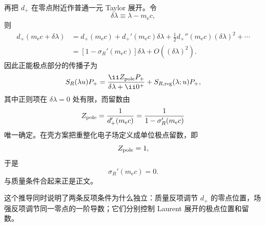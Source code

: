 \begin{derivation}[电子极点的在壳重整化条件]
再把 $d_+$ 在零点附近作普通一元 Taylor 展开。令
\begin{equation*}
 \delta\lambda\equiv\lambda-m_{\mathrm e} c,
\end{equation*}
则
\begin{align*}
 d_+(m_{\mathrm e} c+\delta\lambda)
 &=d_+(m_{\mathrm e} c)
 +d_+'(m_{\mathrm e} c)\delta\lambda
 +\frac12d_+''(m_{\mathrm e} c)(\delta\lambda)^2+\cdots\\
 &=\left[1-\sigma_R'(m_{\mathrm e} c)\right]\delta\lambda
 +O((\delta\lambda)^2).
\end{align*}
因此正能极点部分的传播子为
\begin{equation*}
 S_R(\lambda u)P_+
 =\frac{\ii Z_{\rm pole}P_+}{\delta\lambda+\ii0^+}
 +S_{R,\mathrm{reg}}(\lambda;u)P_+,
\end{equation*}
其中正则项在 $\delta\lambda=0$ 处有限，而留数由
\begin{equation*}
 Z_{\rm pole}
 =\frac{1}{d_+'(m_{\mathrm e} c)}
 =\frac{1}{1-\sigma_R'(m_{\mathrm e} c)}
\end{equation*}
唯一确定。在壳方案把重整化电子场定义成单位极点留数，即
\begin{equation*}
 Z_{\rm pole}=1,
\end{equation*}
于是
\begin{equation*}
 \sigma_R'(m_{\mathrm e} c)=0.
\end{equation*}
与质量条件合起来正是正文。

这个推导同时说明了两条反项条件为什么独立：质量反项调节 $d_+$ 的零点位置，场强反项调节同一零点的一阶导数；它们分别控制 Laurent 展开的极点位置和留数。
\end{derivation}

